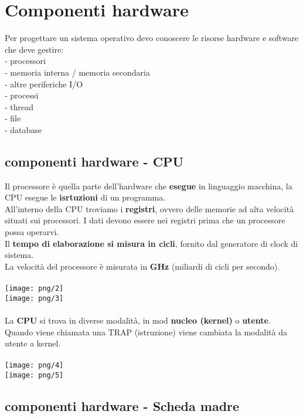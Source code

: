 \documentclass[12pt, letterpaper]{article}
\begin{document}
\section{Componenti hardware}
Per progettare un sistema operativo devo conoscere le risorse hardware e software che deve gestire:
\\
- processori\\
- memoria interna / memoria secondaria \\
- altre periferiche I/O \\
- processi \\
- thread \\
- file \\
- database 
\subsection{componenti hardware - CPU}
Il processore è quella parte dell'hardware che \textbf{esegue} in linguaggio macchina,
la CPU esegue le \textbf{isrtuzioni} di un programma. 
\\
All'interno della CPU troviamo i \textbf{registri}, ovvero delle memorie ad alta velocità situati sui processori.
I dati devono essere nei registri prima che un processore
possa operarvi.
\\Il  \textbf{tempo di elaborazione si misura in cicli}, fornito dal generatore di clock di sistema.
\\
La velocità del processore è misurata in \textbf{GHz} (miliardi di cicli per secondo).
\\
\\
\texttt{[image: png/2]}\\
\texttt{[image: png/3]}
\\
\\
La \textbf{CPU} si trova in diverse modalità, in mod \textbf{nucleo (kernel)} o \textbf{utente}. Quando viene chiamata una TRAP (istruzione) viene cambiata la modalità da utente a kernel.
\\
\\
\texttt{[image: png/4]}\\
\texttt{[image: png/5]}

\subsection{componenti hardware - Scheda madre}
\end{document}
